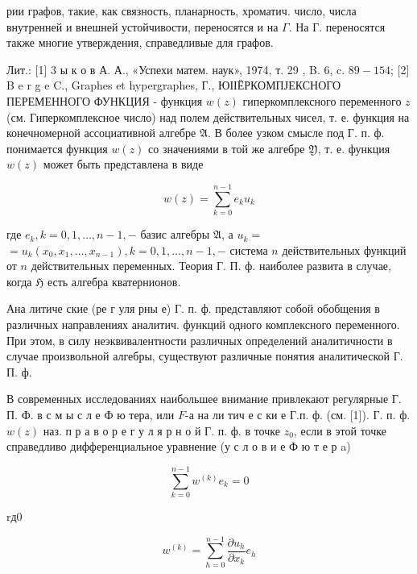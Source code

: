 \documentclass[10pt]{article}
\begin{document}
рии графов, такие, как связность, планарность, хроматич. число, числа внутренней и внешней устойчивости, переносятся и на $\Gamma$. На Г. переносятся также многие утверждения, справедливые для графов.



Лит.: [1] 3 ы к о в А. А., «Успехи матем. наук», 1974, т. 29 , B. 6, c. $89-154$; [2] B e r g e C., Graphes et hypergraphes, Г., ЮІІЁРКОМПЈЕКСНОГО ПЕРЕМЕННОГО ФУНКЦИЯ - функция $w(z)$ гиперкомплексного переменного $z$ (см. Гиперкомплексное число) над полем действительных чисел, т. е. функция на конечномерной ассоциативной алгебре $\mathfrak{A}$. В более узком смысле под Г. п. ф. понимается функция $w(z)$ со значениями в той же алгебре $\mathfrak{Y}$, т. е. функция $w(z)$ может быть представлена в виде



\[

w(z)=\sum_{k=0}^{n-1} e_{k} u_{k}

\]



где $e_{k}, k=0,1, \ldots, n-1,-$ базис алгебры $\mathfrak{A}$, а $u_{k}=$ $=u_{k}\left(x_{0}, x_{1}, \ldots, x_{n-1}\right), k=0,1, \ldots, n-1,-$ система $n$ действительных функций от $n$ действительных переменных. Теория Г. П. ф. наиболее развита в случае, когда $\mathfrak{H}$ есть алгебра кватернионов.



Ана литиче ские (ре г уля рны е) Г. п. ф. представляют собой обобщения в различных направлениях аналитич. функций одного комплексного переменного. При этом, в силу неэквивалентности различных определений аналитичности в случае произвольной алгебры, существуют различные понятия аналитической Г. П. ф.



В современных исследованиях наибольшее внимание привлекают регулярные Г. П. Ф. в с м ы с л е Ф ю тера, или $F$-а на ли тич е с ки е Г.п. ф. (см. [1]). Г. п. ф. $w(z)$ наз. п р а в о р е г у л я р н о й Г. п. ф. в точке $z_{0}$, если в этой точке справедливо дифференциальное уравнение (у с л о в и е Ф ю т е р a)



\[

\sum_{k=0}^{n-1} w^{(k)} e_{k}=0

\]



rд0



\[

w^{(k)}=\sum_{h=0}^{n-1} \frac{\partial u_{h}}{\partial x_{k}} e_{h}

\]
\end{document}
